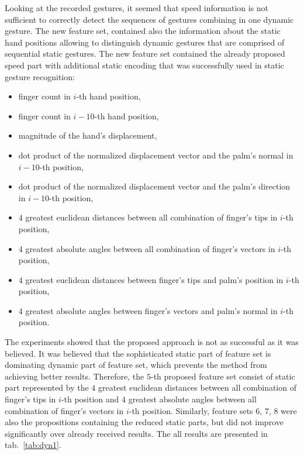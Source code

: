 Looking at the recorded gestures, it seemed that speed information is not sufficient to correctly detect the sequences of gestures combining in one dynamic gesture.
The new feature set, contained also the information about the static hand positions allowing to distinguish dynamic gestures that are comprised of sequential static gestures.
The new feature set contained the already proposed speed part with additional static encoding that was successfully used in static gesture recognition:
\begin{itemize}
\item finger count in $i$-th hand position,
\item finger count in $i-10$-th hand position,
\item magnitude of the hand's displacement,
\item dot product of the normalized displacement vector and the palm's normal in $i-10$-th position,
\item dot product of the normalized displacement vector and the palm's direction in $i-10$-th position,
\item $4$ greatest euclidean distances between all combination of finger's tips in $i$-th position,
\item $4$ greatest absolute angles between all combination of finger's vectors in $i$-th position,
\item $4$ greatest euclidean distances between finger's tips and palm's position in $i$-th position,
\item $4$ greatest absolute angles between finger's vectors and palm's normal in $i$-th position.
\end{itemize}

The experiments showed that the proposed approach is not as successful as it was believed.
It was believed that the sophisticated static part of feature set is dominating dynamic part of feature set, which prevents the method from achieving better results.
Therefore, the $5$-th proposed feature set consist of static part represented by the $4$ greatest euclidean distances between all combination of finger's tips in $i$-th position and $4$ greatest absolute angles between all combination of finger's vectors in $i$-th position.
Similarly, feature sets $6$, $7$, $8$ were also the propositions containing the reduced static parts, but did not improve significantly over already received results. 
The all results are presented in tab.~\ref{tab:dyn1}. 

